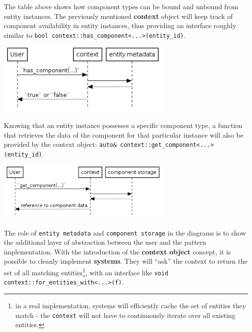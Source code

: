 \documentclass[oneside, 12pt, a4paper, openany]{book}
\let\origfigure=\figure
\let\endorigfigure=\endfigure
\renewenvironment{figure}[1][]{%
\origfigure[H]
}{%
\endorigfigure
}
\begin{document}
The table above shows how component types can be bound and unbound from
entity instances. The previously mentioned \textbf{context} object will
keep track of component availability in entity instances, thus providing
an interface roughly similar to
\texttt{bool context::has_component<...>(entity_id)}.

\begin{figure}
\centering
\includegraphics[width=0.65000\textwidth]{source/figures/generated/ecs/overview/dod_composition/uml_context_has_component.png}
\caption{DOD: checking component type availability through context
object}
\end{figure}

Knowing that an entity instance possesses a specific component type, a
function that retrieves the data of the component for that particular
instance will also be provided by the context object:
\texttt{auto& context::get_component<...>(entity_id)}.

\begin{figure}
\centering
\includegraphics[width=0.65000\textwidth]{source/figures/generated/ecs/overview/dod_composition/uml_context_get_component.png}
\caption{DOD: getting component instance data through context object}
\end{figure}

The role of
\texttt{entity metadata}
and
\texttt{component storage}
in the diagrams is to show the additional layer of abstraction between
the user and the pattern implementation. With the introduction of the
\textbf{context object} concept, it is possible to cleanly implement
\textbf{systems}. They will ``ask'' the context to return the set of all
matching entities\footnote{in a real implementation, systems will
  efficiently cache the set of entities they match - the
  \texttt{context}
  will not have to continuously iterate over all existing entities.},
with an interface like
\texttt{void context::for_entities_with<...>(f)}.
\end{document}
